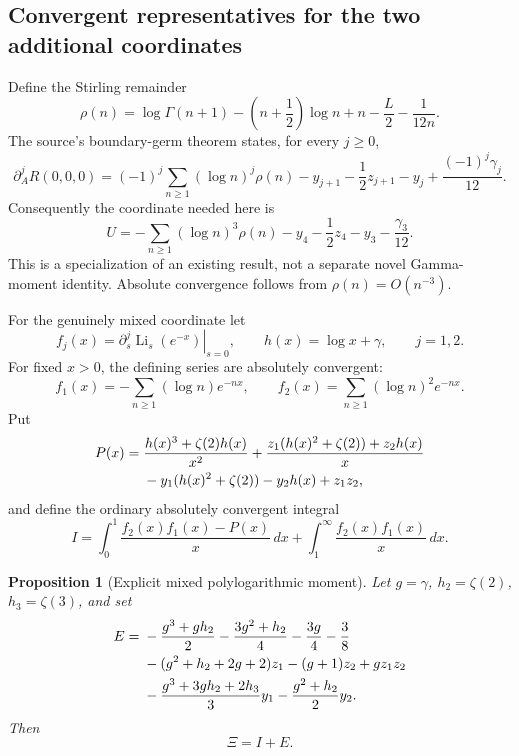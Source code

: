 \documentclass[11pt,a4paper]{article}
\numberwithin{equation}{section}
\newtheorem{proposition}[theorem]{Proposition}
\theoremstyle{definition}
\theoremstyle{remark}
\begin{document}
\subsection{Convergent representatives for the two additional coordinates}

Define the Stirling remainder
\[
 \rho(n)=\log\Gamma(n+1)-\left(n+\frac12\right)\log n+n
                 -\frac L2-\frac1{12n}.
\]
The source's boundary-germ theorem states, for every \(j\ge0\),
\[
 \partial_A^jR(0,0,0)
 =(-1)^j\sum_{n\ge1}(\log n)^j\rho(n)
 -y_{j+1}-\frac12z_{j+1}-y_j
 +\frac{(-1)^j\gamma_j}{12}.
\]
Consequently the coordinate needed here is
\begin{equation}\label{qtr:U}
 U=-\sum_{n\ge1}(\log n)^3\rho(n)
                  -y_4-\frac12z_4-y_3-\frac{\gamma_3}{12}.
\end{equation}
This is a specialization of an existing result, not a separate
novel Gamma-moment identity. Absolute convergence follows from
\(\rho(n)=O(n^{-3})\).

For the genuinely mixed coordinate let
\[
 f_j(x)=\left.\partial_s^j\operatorname{Li}_s(e^{-x})\right|_{s=0},
 \qquad h(x)=\log x+\gamma,\qquad j=1,2.
\]
For fixed \(x>0\), the defining series are absolutely convergent:
\[
 f_1(x)=-\sum_{n\ge1}(\log n)e^{-nx},\qquad
 f_2(x)=\sum_{n\ge1}(\log n)^2e^{-nx}.
\]
Put
\begin{align}
 P(x)={}&\frac{h(x)^3+\zeta(2)h(x)}{x^2}
 +\frac{z_1(h(x)^2+\zeta(2))+z_2h(x)}{x}\notag\\
 &-y_1(h(x)^2+\zeta(2))-y_2h(x)+z_1z_2,
 \label{qtr:P}
\end{align}
and define the ordinary absolutely convergent integral
\begin{equation}\label{qtr:I}
 I=\int_0^1\frac{f_2(x)f_1(x)-P(x)}{x}\,dx
                  +\int_1^\infty\frac{f_2(x)f_1(x)}{x}\,dx.
\end{equation}

\begin{proposition}[Explicit mixed polylogarithmic moment]
\label{qtr:Xiprop}
Let \(g=\gamma\), \(h_2=\zeta(2)\), \(h_3=\zeta(3)\), and set
\begin{align}
 E={}&-\frac{g^3+gh_2}{2}
       -\frac{3g^2+h_2}{4}-\frac{3g}{4}-\frac38\notag\\
 &-(g^2+h_2+2g+2)z_1-(g+1)z_2+gz_1z_2\notag\\
 &-\frac{g^3+3gh_2+2h_3}{3}y_1
       -\frac{g^2+h_2}{2}y_2.
 \label{qtr:E}
\end{align}
Then
\begin{equation}\label{qtr:Xi}
 \Xi=I+E.
\end{equation}
\end{proposition}
\end{document}
